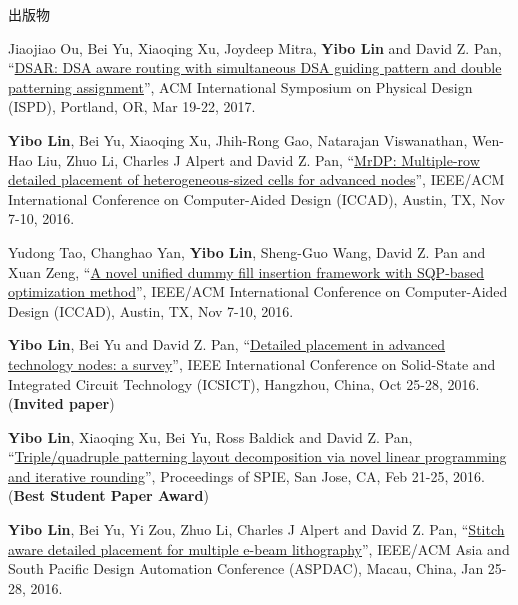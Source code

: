 \begin{rSection}{出版物}
\begin{description}[font=\normalfont, rightmargin=2em]
{}
            

\item[{[C9]}]{
        Jiaojiao Ou, Bei Yu, Xiaoqing Xu, Joydeep Mitra, \textbf{Yibo Lin} and David Z. Pan, 
    ``\href{https://doi.org/10.1145/3036669.3036677}{DSAR: DSA aware routing with simultaneous DSA guiding pattern and double patterning assignment}'', 
    ACM International Symposium on Physical Design (ISPD), Portland, OR, Mar 19-22, 2017.
    
}
            

\item[{[C8]}]{
        \textbf{Yibo Lin}, Bei Yu, Xiaoqing Xu, Jhih-Rong Gao, Natarajan Viswanathan, Wen-Hao Liu, Zhuo Li, Charles J Alpert and David Z. Pan, 
    ``\href{http://dx.doi.org/10.1145/2966986.2967055}{MrDP: Multiple-row detailed placement of heterogeneous-sized cells for advanced nodes}'', 
    IEEE/ACM International Conference on Computer-Aided Design (ICCAD), Austin, TX, Nov 7-10, 2016.
    
}
            

\item[{[C7]}]{
        Yudong Tao, Changhao Yan, \textbf{Yibo Lin}, Sheng-Guo Wang, David Z. Pan and Xuan Zeng, 
    ``\href{http://dx.doi.org/10.1145/2966986.2966994}{A novel unified dummy fill insertion framework with SQP-based optimization method}'', 
    IEEE/ACM International Conference on Computer-Aided Design (ICCAD), Austin, TX, Nov 7-10, 2016.
    
}
            

\item[{[C6]}]{
        \textbf{Yibo Lin}, Bei Yu and David Z. Pan, 
    ``\href{https://doi.org/10.1109/ICSICT.2016.7999056}{Detailed placement in advanced technology nodes: a survey}'', 
    IEEE International Conference on Solid-State and Integrated Circuit Technology (ICSICT), Hangzhou, China, Oct 25-28, 2016.
    (\textbf{Invited paper})
}
            

\item[{[C5]}]{
        \textbf{Yibo Lin}, Xiaoqing Xu, Bei Yu, Ross Baldick and David Z. Pan, 
    ``\href{http://dx.doi.org/10.1117/12.2218628}{Triple/quadruple patterning layout decomposition via novel linear programming and iterative rounding}'', 
    Proceedings of SPIE, San Jose, CA, Feb 21-25, 2016.
    (\textbf{Best Student Paper Award})
}
            

\item[{[C4]}]{
        \textbf{Yibo Lin}, Bei Yu, Yi Zou, Zhuo Li, Charles J Alpert and David Z. Pan, 
    ``\href{http://ieeexplore.ieee.org/xpl/articleDetails.jsp?arnumber=7428009}{Stitch aware detailed placement for multiple e-beam lithography}'', 
    IEEE/ACM Asia and South Pacific Design Automation Conference (ASPDAC), Macau, China, Jan 25-28, 2016.
    
}
\end{description}
\end{rSection}

